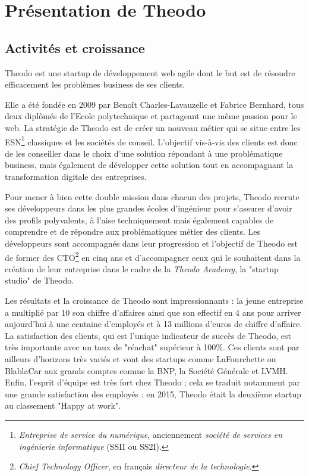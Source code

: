 \section{Présentation de Theodo}

\subsection{Activités et croissance}

Theodo est une startup de développement web agile dont le but est de résoudre efficacement les problèmes \foreignlanguage{english}{business} de ses clients.

Elle a été fondée en 2009 par Benoît Charles-Lavauzelle et Fabrice Bernhard, tous deux diplômés de l'Ecole polytechnique et partageant une même passion pour le web. La stratégie de Theodo est de créer un nouveau métier qui se situe entre les ESN\footnote{\textit{Entreprise de service du numérique}, anciennement \textit{société de services en ingénierie informatique} (SSII ou SS2I).} classiques et les sociétés de conseil. L'objectif vis-à-vis des clients est donc de les conseiller dans le choix d'une solution répondant à une problématique business, mais également de développer cette solution tout en accompagnant la transformation digitale des entreprises.

Pour mener à bien cette double mission dans chacun des projets, Theodo recrute ses développeurs dans les plus grandes écoles d'ingénieur pour s'assurer d'avoir des profils polyvalents, à l'aise techniquement mais également capables de comprendre et de répondre aux problématiques métier des clients. Les développeurs sont accompagnés dans leur progression et l'objectif de Theodo est de former des CTO\footnote{\textit{\foreignlanguage{english}{Chief Technology Officer}}, en français \textit{directeur de la technologie}.} en cinq ans et d'accompagner ceux qui le souhaitent dans la création de leur entreprise dans le cadre de la \textit{\foreignlanguage{english}{Theodo Academy}}, la "startup studio" de Theodo.

Les résultats et la croissance de Theodo sont impressionnants : la jeune entreprise a multiplié par 10 son chiffre d'affaires ainsi que son effectif en 4 ans pour arriver aujourd'hui à une centaine d'employés et à 13 millions d'euros de chiffre d'affaire. La satisfaction des clients, qui est l'unique indicateur de succès de Theodo, est très importante avec un taux de "réachat" supérieur à 100\%. Ces clients sont par ailleurs d'horizons très variés et vont des startups comme LaFourchette ou BlablaCar aux grands comptes comme la BNP, la Société Générale et LVMH. Enfin, l'esprit d'équipe est très fort chez Theodo ; cela se traduit notamment par une grande satisfaction des employés : en 2015, Theodo était la deuxième startup au classement "Happy at work".

